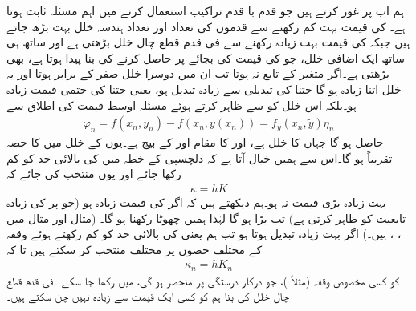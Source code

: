 ہم اب  پر غور کرتے ہیں جو قدم با قدم تراکیب استعمال کرنے میں اہم مسئلہ ثابت ہوتا ہے۔ کی قیمت بہت کم رکھنے سے قدموں کی تعداد اور  تعداد ہندسہ خلل بہت بڑھ جاتے ہیں جبکہ  کی قیمت بہت زیادہ رکھنے سے  فی قدم قطع چال خلل بڑھتی ہے اور ساتھ ہی ساتھ ایک اضافی خلل، جو  کی قیمت  کی بجائے  پر حاصل کرنے کی بنا پیدا ہوتا ہے، بھی بڑھتی  ہے۔اگر  متغیر  کے تابع نہ ہوتا تب ان میں دوسرا خلل صفر کے برابر ہوتا اور یہ خلل اتنا زیادہ ہو گا جتنا  کی تبدیلی سے  زیادہ تبدیل ہو، یعنی جتنا  کی حتمی قیمت زیادہ ہو۔بلکہ اس خلل کو  سے ظاہر کرتے ہوئے مسئلہ اوسط قیمت کی اطلاق سے 
\begin{align*}
\varphi_n=f(x_n,y_n)-f(x_n,y(x_n))=f_y(x_n,\tilde{y})\eta_n
\end{align*}
حاصل ہو گا جہاں   کا خلل  ہے، اور  کا مقام    اور  کے بیچ ہے۔یوں  کے خلل میں  کا حصہ تقریباً  ہو گا۔اس سے ہمیں خیال آتا ہے کہ دلچسپی کے خطہ میں  کی بالائی حد  کو کم رکھا جائے اور  یوں منتخب کی جائے کہ
\begin{align*}
\kappa=hK
\end{align*}
بہت زیادہ بڑی قیمت نہ ہو۔ہم دیکھتے ہیں کہ اگر  کی قیمت زیادہ ہو (جو  پر  کی زیادہ تابعیت کو ظاہر کرتی ہے) تب  بڑا ہو گا لہٰذا ہمیں  چھوٹا رکھنا ہو گا۔ (مثال  اور مثال  میں ، ،  ہیں۔) اگر  بہت زیادہ تبدیل ہوتا ہو تب ہم  یعنی  کی بالائی حد کو کم رکھتے ہوئے وقفہ کے مختلف حصوں پر مختلف  منتخب کر سکتے ہیں تا کہ 
\begin{align*}
\kappa_n=hK_n
\end{align*}
کو کسی مخصوص  وقفہ (مثلاً )، جو  درکار درستگی پر منحصر ہو گی،  میں رکھا جا سکے ۔فی قدم قطع چال خلل کی بنا ہم  کو کسی ایک قیمت سے زیادہ نہیں چن سکتے ہیں۔

